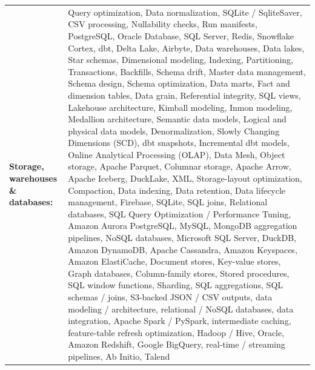 \documentclass[letterpaper,11pt]{article}
\begin{document}
\par\vspace{2pt}
\begin{tabularx}{\linewidth}{@{}>{\raggedright\arraybackslash}p{1.8in}X@{}}
\textbf{Storage, warehouses \& databases:} & \footnotesize{Query optimization, Data normalization, SQLite / SqliteSaver, CSV processing, Nullability checks, Run manifests, PostgreSQL, Oracle Database, SQL Server, Redis, Snowflake Cortex, dbt, Delta Lake, Airbyte, Data warehouses, Data lakes, Star schemas, Dimensional modeling, Indexing, Partitioning, Transactions, Backfills, Schema drift, Master data management, Schema design, Schema optimization, Data marts, Fact and dimension tables, Data grain, Referential integrity, SQL views, Lakehouse architecture, Kimball modeling, Inmon modeling, Medallion architecture, Semantic data models, Logical and physical data models, Denormalization, Slowly Changing Dimensions (SCD), dbt snapshots, Incremental dbt models, Online Analytical Processing (OLAP), Data Mesh, Object storage, Apache Parquet, Columnar storage, Apache Arrow, Apache Iceberg, DuckLake, XML, Storage-layout optimization, Compaction, Data indexing, Data retention, Data lifecycle management, Firebase, SQLite, SQL joins, Relational databases, SQL Query Optimization / Performance Tuning, Amazon Aurora PostgreSQL, MySQL, MongoDB aggregation pipelines, NoSQL databases, Microsoft SQL Server, DuckDB, Amazon DynamoDB, Apache Cassandra, Amazon Keyspaces, Amazon ElastiCache, Document stores, Key-value stores, Graph databases, Column-family stores, Stored procedures, SQL window functions, Sharding, SQL aggregations, SQL schemas / joins, S3-backed JSON / CSV outputs, data modeling / architecture, relational / NoSQL databases, data integration, Apache Spark / PySpark, intermediate caching, feature-table refresh optimization, Hadoop / Hive, Oracle, Amazon Redshift, Google BigQuery, real-time / streaming pipelines, Ab Initio, Talend}\\
\end{tabularx}
\par\vspace{2pt}
\end{document}
